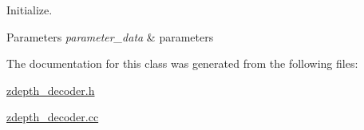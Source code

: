 Initialize. 


\begin{DoxyParams}{Parameters}
{\em parameter\+\_\+data} & parameters \\
\hline
\end{DoxyParams}


The documentation for this class was generated from the following files\+:\begin{DoxyCompactItemize}
\item 
\hyperlink{zdepth__decoder_8h}{zdepth\+\_\+decoder.\+h}\item 
\hyperlink{zdepth__decoder_8cc}{zdepth\+\_\+decoder.\+cc}\end{DoxyCompactItemize}
